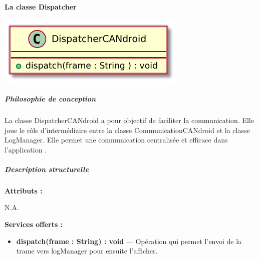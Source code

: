 \paragraph{La classe Dispatcher}


\begin{minipage}
    {\linewidth}
    \centering
    \includegraphics[width=0.50\linewidth]{../schemas/Conception_detaillee/classe_dispatcher_candroid.pdf}
\end{minipage}
\subparagraph{Philosophie de conception \newline} 

\medspace


La classe DispatcherCANdroid a pour objectif de faciliter la communication. Elle joue le rôle d'intermédiaire entre la classe CommunicationCANdroid et la classe LogManager. Elle permet une communication centralisée et efficace dans l'application {\nomApplication}. 

\subparagraph{Description structurelle \newline}


\medspace

\textbf{Attributs :}

N.A.

\textbf{Services offerts :}

\begin{itemize}
    \item \textbf{dispatch(frame : String) : void} --- Opération qui permet l'envoi de la trame vers logManager pour ensuite l'afficher. 
\end{itemize}